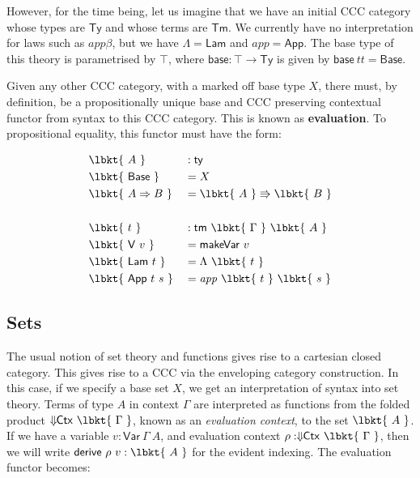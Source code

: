 However, for the time being, let us imagine that we have an initial CCC category
whose types are $\mathsf{Ty}$ and whose terms are $\mathsf{Tm}$. We currently
have no interpretation for laws such as $\mathit{app}\beta$, but we have
$\Lambda = \mathsf{Lam}$ and $\mathit{app} = \mathsf{App}$. The base type of
this theory is parametrised by $\top$, where $\mathsf{base} : \top \to
\mathsf{Ty}$ is given by $\mathsf{base}~tt = \mathsf{Base}$.

Given any other CCC category, with a marked off base type $X$, there must, by
definition, be a propositionally unique base and CCC preserving contextual
functor from syntax to this CCC category. This is known as \textbf{evaluation}.
To propositional equality, this functor must have the form:

\begin{align*}
& \lbkt{~A~} & &: \mathsf{ty} \\
& \lbkt{~\mathsf{Base}~} & &= X \\
& \lbkt{~A \Rightarrow B~} & &= \lbkt{~A~} \Rrightarrow \lbkt{~B~} \\
\\
& \lbkt{~t~} & &: \mathsf{tm}~\lbkt{~\Gamma~}~\lbkt{~A~} \\
& \lbkt{~\mathsf{V}~v~} & &= \mathsf{makeVar}~v \\
& \lbkt{~\mathsf{Lam}~t~} & &= \Lambda~\lbkt{~t~} \\
& \lbkt{~\mathsf{App}~t~s~} & &= \mathit{app}~\lbkt{~t~}~\lbkt{~s~}
\end{align*}

\subsection{Sets} \label{section:Sets}

The usual notion of set theory and functions gives rise to a cartesian closed
category. This gives rise to a CCC via the enveloping category construction. In
this case, if we specify a base set $X$, we get an interpretation of syntax into
set theory. Terms of type $A$ in context $\Gamma$ are interpreted as functions
from the folded product $\Downarrow\!\!\mathsf{Ctx}~\lbkt{~\Gamma~}$, known as
an \emph{evaluation context}, to the set $\lbkt{~A~}$. If we have a variable $v
: \mathsf{Var}~\Gamma~A$, and evaluation context $\rho : \Downarrow\!\!
\mathsf{Ctx}~\lbkt{~\Gamma~}$, then we will write $\mathsf{derive}~\rho~v :
\lbkt{~A~}$ for the evident indexing. The evaluation functor becomes:

